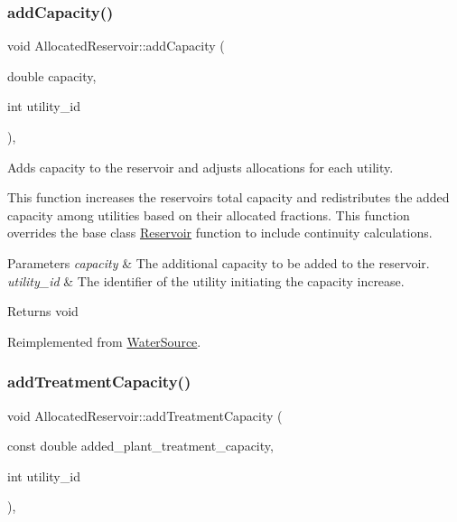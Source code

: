 \subsubsection{\texorpdfstring{add\+Capacity()}{addCapacity()}}
{\footnotesize\ttfamily void Allocated\+Reservoir\+::add\+Capacity (\begin{DoxyParamCaption}\item[{double}]{capacity,  }\item[{int}]{utility\+\_\+id }\end{DoxyParamCaption})\hspace{0.3cm}{\ttfamily [override]}, {\ttfamily [virtual]}}



Adds capacity to the reservoir and adjusts allocations for each utility. 

This function increases the reservoir\textquotesingle{}s total capacity and redistributes the added capacity among utilities based on their allocated fractions. This function overrides the base class {\ttfamily \mbox{\hyperlink{classReservoir}{Reservoir}}} function to include continuity calculations.


\begin{DoxyParams}{Parameters}
{\em capacity} & The additional capacity to be added to the reservoir. \\
\hline
{\em utility\+\_\+id} & The identifier of the utility initiating the capacity increase.\\
\hline
\end{DoxyParams}
\begin{DoxyReturn}{Returns}
void 
\end{DoxyReturn}


Reimplemented from \mbox{\hyperlink{classWaterSource_ab869abb3d3dde1875e933482bedc3ae3}{Water\+Source}}.

\mbox{\label{classAllocatedReservoir_ab781bee3253277f1dcfa4c12756d9d6f}} 
\subsubsection{\texorpdfstring{add\+Treatment\+Capacity()}{addTreatmentCapacity()}}
{\footnotesize\ttfamily void Allocated\+Reservoir\+::add\+Treatment\+Capacity (\begin{DoxyParamCaption}\item[{const double}]{added\+\_\+plant\+\_\+treatment\+\_\+capacity,  }\item[{int}]{utility\+\_\+id }\end{DoxyParamCaption})\hspace{0.3cm}{\ttfamily [override]}, {\ttfamily [virtual]}}



